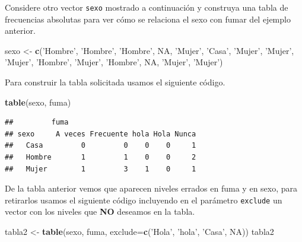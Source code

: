 \documentclass[10pt,]{krantz}
\makeatletter
\newenvironment{Shaded}{\begin{snugshade}}{\end{snugshade}}
\newcommand{\KeywordTok}[1]{\textcolor[rgb]{0.13,0.29,0.53}{\textbf{{#1}}}}
\newcommand{\DataTypeTok}[1]{\textcolor[rgb]{0.13,0.29,0.53}{{#1}}}
\newcommand{\StringTok}[1]{\textcolor[rgb]{0.31,0.60,0.02}{{#1}}}
\newcommand{\OtherTok}[1]{\textcolor[rgb]{0.56,0.35,0.01}{{#1}}}
\newcommand{\NormalTok}[1]{{#1}}
\newenvironment{kframe}{%
\medskip{}
\setlength{\fboxsep}{.8em}
 \def\at@end@of@kframe{}%
 \ifinner\ifhmode%
  \def\at@end@of@kframe{\end{minipage}}%
  \begin{minipage}{\columnwidth}%
 \fi\fi%
 \def\FrameCommand##1{\hskip\@totalleftmargin \hskip-\fboxsep
 \colorbox{shadecolor}{##1}\hskip-\fboxsep
     \hskip-\linewidth \hskip-\@totalleftmargin \hskip\columnwidth}%
 \MakeFramed {\advance\hsize-\width
   \@totalleftmargin\z@ \linewidth\hsize
   \@setminipage}}%
 {\par\unskip\endMakeFramed%
 \at@end@of@kframe}
\renewenvironment{Shaded}{\begin{kframe}}{\end{kframe}}
\makeatother
\begin{document}
Considere otro vector \texttt{sexo} mostrado a continuación y construya
una tabla de frecuencias absolutas para ver cómo se relaciona el sexo
con fumar del ejemplo anterior.

\begin{Shaded}
\begin{Highlighting}[]
\NormalTok{sexo <-}\StringTok{ }\KeywordTok{c}\NormalTok{(}\StringTok{'Hombre'}\NormalTok{, }\StringTok{'Hombre'}\NormalTok{, }\StringTok{'Hombre'}\NormalTok{, }\OtherTok{NA}\NormalTok{, }\StringTok{'Mujer'}\NormalTok{,}
          \StringTok{'Casa'}\NormalTok{, }\StringTok{'Mujer'}\NormalTok{, }\StringTok{'Mujer'}\NormalTok{, }\StringTok{'Mujer'}\NormalTok{, }\StringTok{'Hombre'}\NormalTok{, }\StringTok{'Mujer'}\NormalTok{, }
          \StringTok{'Hombre'}\NormalTok{, }\OtherTok{NA}\NormalTok{, }\StringTok{'Mujer'}\NormalTok{, }\StringTok{'Mujer'}\NormalTok{)}
\end{Highlighting}
\end{Shaded}

Para construir la tabla solicitada usamos el siguiente código.

\begin{Shaded}
\begin{Highlighting}[]
\KeywordTok{table}\NormalTok{(sexo, fuma)}
\end{Highlighting}
\end{Shaded}

\begin{verbatim}
##         fuma
## sexo     A veces Frecuente hola Hola Nunca
##   Casa         0         0    0    0     1
##   Hombre       1         1    0    0     2
##   Mujer        1         3    1    0     1
\end{verbatim}

De la tabla anterior vemos que aparecen niveles errados en fuma y en
sexo, para retirarlos usamos el siguiente código incluyendo en el
parámetro \texttt{exclude} un vector con los niveles que \textbf{NO}
deseamos en la tabla.

\begin{Shaded}
\begin{Highlighting}[]
\NormalTok{tabla2 <-}\StringTok{ }\KeywordTok{table}\NormalTok{(sexo, fuma, }\DataTypeTok{exclude=}\KeywordTok{c}\NormalTok{(}\StringTok{'Hola'}\NormalTok{, }\StringTok{'hola'}\NormalTok{, }\StringTok{'Casa'}\NormalTok{, }\OtherTok{NA}\NormalTok{))}
\NormalTok{tabla2}
\end{Highlighting}
\end{Shaded}
\end{document}
